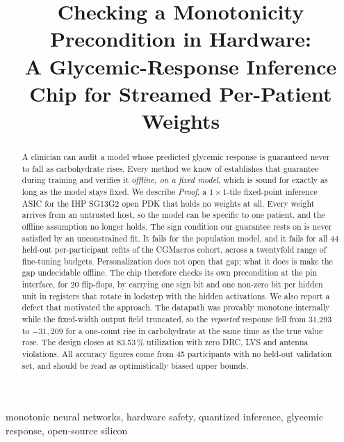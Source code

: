 \documentclass[conference]{IEEEtran}
\begin{document}
\title{Checking a Monotonicity Precondition in Hardware:\\
A Glycemic-Response Inference Chip for Streamed Per-Patient Weights}

\author{
}

\maketitle

\begin{abstract}
A clinician can audit a model whose predicted glycemic response is guaranteed
never to fall as carbohydrate rises. Every method we know of establishes that
guarantee during training and verifies it \emph{offline, on a fixed model},
which is sound for exactly as long as the model stays fixed. We describe
\emph{Proof}, a $1\times1$-tile fixed-point inference ASIC for the IHP SG13G2
open PDK that holds no weights at all. Every weight arrives from an untrusted
host, so the model can be specific to one patient, and the offline assumption
no longer holds. The sign condition our guarantee rests on is never satisfied
by an unconstrained fit. It fails for the population model, and it fails for
all 44 held-out per-participant refits of the CGMacros cohort, across a
twentyfold range of fine-tuning budgets. Personalization does not open that
gap; what it does is make the gap undecidable offline. The chip therefore
checks its own precondition at the pin interface, for 20 flip-flops, by
carrying one sign bit and one non-zero bit per hidden unit in registers that
rotate in lockstep with the hidden activations. We also report a defect that
motivated the approach. The datapath was provably monotone internally while the
fixed-width output field truncated, so the \emph{reported} response fell from
31{,}293 to $-31{,}209$ for a one-count rise in carbohydrate at the same time
as the true value rose. The design closes at 83.53\,\% utilization with zero
DRC, LVS and antenna violations. All accuracy figures come from 45 participants
with no held-out validation set, and should be read as optimistically biased
upper bounds.
\end{abstract}

\begin{IEEEkeywords}
monotonic neural networks, hardware safety, quantized inference, glycemic
response, open-source silicon
\end{IEEEkeywords}
\end{document}
